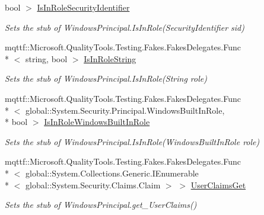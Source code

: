 \begin{DoxyCompactItemize}
bool $>$ \hyperlink{class_system_1_1_security_1_1_principal_1_1_fakes_1_1_stub_windows_principal_ab7e601c0a949603031f93aee8997723c}{Is\-In\-Role\-Security\-Identifier}
\begin{DoxyCompactList}\small\item\em Sets the stub of Windows\-Principal.\-Is\-In\-Role(\-Security\-Identifier sid)\end{DoxyCompactList}\item 
mqttf\-::\-Microsoft.\-Quality\-Tools.\-Testing.\-Fakes.\-Fakes\-Delegates.\-Func\\*
$<$ string, bool $>$ \hyperlink{class_system_1_1_security_1_1_principal_1_1_fakes_1_1_stub_windows_principal_ab15c5724f12de5523645dc1a8ade8be6}{Is\-In\-Role\-String}
\begin{DoxyCompactList}\small\item\em Sets the stub of Windows\-Principal.\-Is\-In\-Role(\-String role)\end{DoxyCompactList}\item 
mqttf\-::\-Microsoft.\-Quality\-Tools.\-Testing.\-Fakes.\-Fakes\-Delegates.\-Func\\*
$<$ global\-::\-System.\-Security.\-Principal.\-Windows\-Built\-In\-Role, \\*
bool $>$ \hyperlink{class_system_1_1_security_1_1_principal_1_1_fakes_1_1_stub_windows_principal_add8188c541745a6065a9114addcc948c}{Is\-In\-Role\-Windows\-Built\-In\-Role}
\begin{DoxyCompactList}\small\item\em Sets the stub of Windows\-Principal.\-Is\-In\-Role(\-Windows\-Built\-In\-Role role)\end{DoxyCompactList}\item 
mqttf\-::\-Microsoft.\-Quality\-Tools.\-Testing.\-Fakes.\-Fakes\-Delegates.\-Func\\*
$<$ global\-::\-System.\-Collections.\-Generic.\-I\-Enumerable\\*
$<$ global\-::\-System.\-Security.\-Claims.\-Claim $>$ $>$ \hyperlink{class_system_1_1_security_1_1_principal_1_1_fakes_1_1_stub_windows_principal_a0d76c7e83330a7ba22984ea776ca9be2}{User\-Claims\-Get}
\begin{DoxyCompactList}\small\item\em Sets the stub of Windows\-Principal.\-get\-\_\-\-User\-Claims()\end{DoxyCompactList}\end{DoxyCompactItemize}
